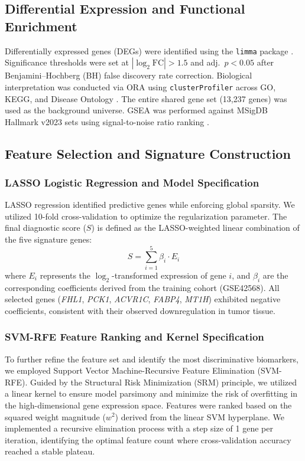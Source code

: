 \documentclass[a4paper,fleqn]{cas-dc}
\newcommand{\gene}[1]{\textit{#1}}
\begin{document}
\subsection{Differential Expression and Functional Enrichment}\label{sec:deg}
Differentially expressed genes (DEGs) were identified using the \texttt{limma} package \citep{ritchie2015}. Significance thresholds were set at $|\log_2\mathrm{FC}| > 1.5$ and adj.\ $p < 0.05$ after Benjamini--Hochberg (BH) false discovery rate correction. Biological interpretation was conducted via ORA using \texttt{clusterProfiler} \citep{yu2012} across GO, KEGG, and Disease Ontology \citep{yu2015}. The entire shared gene set (13,237 genes) was used as the background universe. GSEA was performed against MSigDB Hallmark v2023 sets using signal-to-noise ratio ranking \citep{subramanian2005}.

\subsection{Feature Selection and Signature Construction}\label{sec:features}

\subsubsection{LASSO Logistic Regression and Model Specification}\label{sec:lasso}
LASSO regression identified predictive genes while enforcing global sparsity. We utilized 10-fold cross-validation to optimize the regularization parameter. The final diagnostic score ($S$) is defined as the LASSO-weighted linear combination of the five signature genes:
\begin{equation}
S = \sum_{i=1}^{5} \beta_i \cdot E_i
\end{equation}
where $E_i$ represents the $\log_2$-transformed expression of gene $i$, and $\beta_i$ are the corresponding coefficients derived from the training cohort (GSE42568). All selected genes (\gene{FHL1}, \gene{PCK1}, \gene{ACVR1C}, \gene{FABP4}, \gene{MT1H}) exhibited negative coefficients, consistent with their observed downregulation in tumor tissue.

\subsubsection{SVM-RFE Feature Ranking and Kernel Specification}\label{sec:svmrfe}
To further refine the feature set and identify the most discriminative biomarkers, we employed Support Vector Machine-Recursive Feature Elimination (SVM-RFE). Guided by the Structural Risk Minimization (SRM) principle, we utilized a linear kernel to ensure model parsimony and minimize the risk of overfitting in the high-dimensional gene expression space. Features were ranked based on the squared weight magnitude ($w^2$) derived from the linear SVM hyperplane. We implemented a recursive elimination process with a step size of 1 gene per iteration, identifying the optimal feature count where cross-validation accuracy reached a stable plateau.
\end{document}

